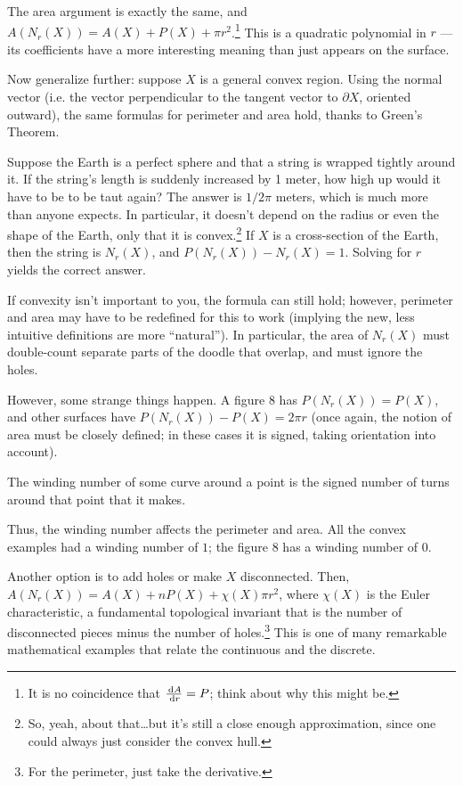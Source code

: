 The area argument is exactly the same, and $A(N_r(X)) = A(X)+P(X) + \pi r^2$.\footnote{It is no coincidence that $\frac{\,\mathrm{d} A}{\,\mathrm{d} r} = P$; think about why this might be.} This is a quadratic polynomial in $r$ --- its coefficients have a more interesting meaning than just appears on the surface.

Now generalize further: suppose $X$ is a general convex region. Using the normal vector (i.e. the vector perpendicular to the tangent vector to $\partial X$, oriented outward), the same formulas for perimeter and area hold, thanks to Green's Theorem.

Suppose the Earth is a perfect sphere and that a string is wrapped tightly around it. If the string's length is suddenly increased by 1 meter, how high up would it have to be to be taut again? The answer is $1/2\pi$ meters, which is much more than anyone expects. In particular, it doesn't depend on the radius or even the shape of the Earth, only that it is convex.\footnote{So, yeah, about that\dots but it's still a close enough approximation, since one could always just consider the convex hull.} If $X$ is a cross-section of the Earth, then the string is $N_r(X)$, and $P(N_r(X)) - N_r(X) = 1$. Solving for $r$ yields the correct answer.

If convexity isn't important to you, the formula can still hold; however, perimeter and area may have to be redefined for this to work (implying the new, less intuitive definitions are more ``natural''). In particular, the area of $N_r(X)$ must double-count separate parts of the doodle that overlap, and must ignore the holes.

However, some strange things happen. A figure 8 has $P(N_r(X)) = P(X)$, and other surfaces have $P(N_r(X)) - P(X) = 2\pi r$ (once again, the notion of area must be closely defined; in these cases it is signed, taking orientation into account).
\begin{defn}
The winding number of some curve around a point is the signed number of turns around that point that it makes.
\end{defn}
Thus, the winding number affects the perimeter and area. All the convex examples had a winding number of $1$; the figure $8$ has a winding number of $0$.

Another option is to add holes or make $X$ disconnected. Then, $A(N_r(X)) = A(X) +nP(X) +\chi(X)\pi r^2$, where $\chi(X)$ is the Euler characteristic, a fundamental topological invariant that is the number of disconnected pieces minus the number of holes.\footnote{For the perimeter, just take the derivative.} This is one of many remarkable mathematical examples that relate the continuous and the discrete.

